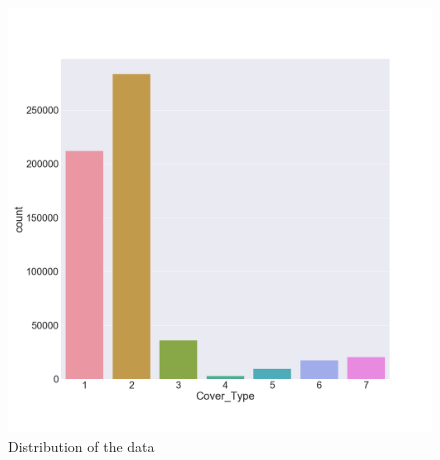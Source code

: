 \documentclass{article}
\begin{document}
    



\begin{figure} [H]
    \includegraphics[width=1\textwidth]{Figures/instances_forest.png}
\caption{Distribution of the data}
\end{figure}
\label{fig:hist_wine}
\end{document}
